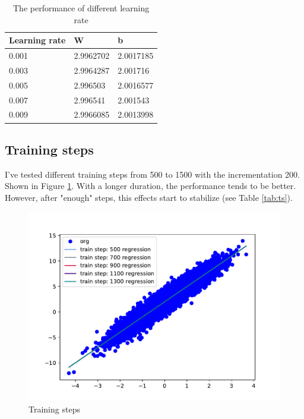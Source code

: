 \documentclass{article}
\begin{document}
\begin{table}
  \caption{The performance of different learning rate}
  \label{tab:lr}
  \centering
  \begin{tabular}{lll}
    \toprule
    Learning rate     & W     & b \\
    \midrule
    0.001 & 2.9962702  & 2.0017185     \\
    0.003     & 2.9964287 & 2.001716     \\
    0.005     & 2.996503       & 2.0016577  \\
    0.007     & 2.996541 & 2.001543      \\
    0.009     & 2.9966085      & 2.0013998  \\
    \bottomrule
  \end{tabular}
\end{table}

\subsection{Training steps}
I've tested different training steps from 500 to 1500 with the incrementation 200. Shown in Figure \ref{ts}. With a longer duration, the performance tends to be better. However, after "enough" steps, this effects start to stabilize (see Table \ref{tab:ts}).


\begin{figure}[!h]
  \centering
  \includegraphics[scale=0.5]{imgs/ts.pdf}
  \caption{Training steps}
  \label{ts}
\end{figure}
\end{document}
